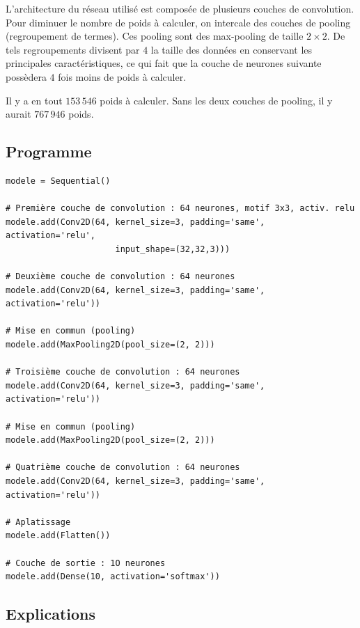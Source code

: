 \documentclass[11pt,class=report,crop=false]{standalone}
\begin{document}
L'architecture du réseau utilisé est composée de plusieurs couches de convolution.
Pour diminuer le nombre de poids à calculer, on intercale des couches de pooling (regroupement de termes). Ces pooling sont des max-pooling de taille $2 \times 2$.
De tels regroupements divisent par $4$ la taille des données en conservant les principales caractéristiques, ce qui fait que la couche de neurones suivante possèdera $4$ fois moins de poids à calculer.
 
 
 
Il y a en tout $153\,546$ poids à calculer. 
Sans les deux couches de pooling, il y aurait $767\,946$ poids.

\subsection{Programme}

\begin{lstlisting}
modele = Sequential()

# Première couche de convolution : 64 neurones, motif 3x3, activ. relu
modele.add(Conv2D(64, kernel_size=3, padding='same', activation='relu',
                      input_shape=(32,32,3)))

# Deuxième couche de convolution : 64 neurones
modele.add(Conv2D(64, kernel_size=3, padding='same', activation='relu'))

# Mise en commun (pooling)
modele.add(MaxPooling2D(pool_size=(2, 2)))

# Troisième couche de convolution : 64 neurones
modele.add(Conv2D(64, kernel_size=3, padding='same', activation='relu'))

# Mise en commun (pooling)
modele.add(MaxPooling2D(pool_size=(2, 2)))

# Quatrième couche de convolution : 64 neurones
modele.add(Conv2D(64, kernel_size=3, padding='same', activation='relu'))

# Aplatissage 
modele.add(Flatten())

# Couche de sortie : 1O neurones
modele.add(Dense(10, activation='softmax'))
\end{lstlisting}

\subsection{Explications}
\end{document}

